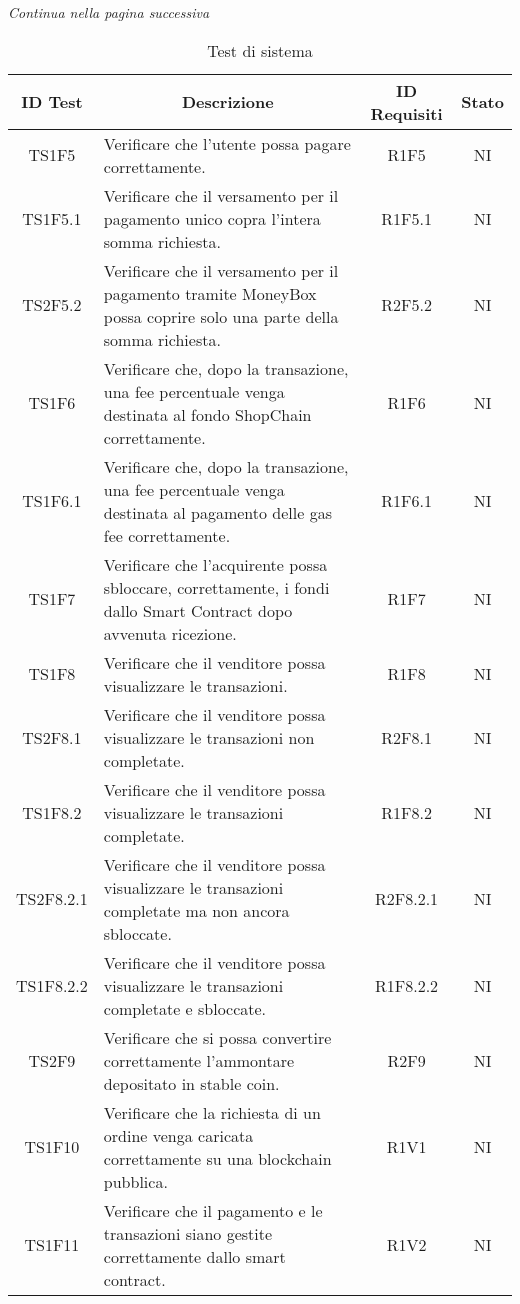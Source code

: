 \begin{center}
  \textit{\small Continua nella pagina successiva}
\end{center}
\begin{table}[H]
  \centering
  \renewcommand{\arraystretch}{1.8}
  \begin{tabular}{c|p{8cm}|c|c}
    \rowcolor[HTML]{125E28}
    \color[HTML]{FFFFFF}\textbf{ID Test}
    & \multicolumn{1}{c}{\color[HTML]{FFFFFF}\textbf{Descrizione}}
    & \color[HTML]{FFFFFF}\textbf{ID Requisiti}
    & \color[HTML]{FFFFFF}\textbf{Stato}\\
    \hline
    TS1F5 &	Verificare che l'utente possa pagare correttamente. &	R1F5 &	NI \\
    TS1F5.1 &	Verificare che il versamento per il pagamento unico copra l'intera somma richiesta. &	R1F5.1 &	NI \\
    TS2F5.2 &	Verificare che il versamento per il pagamento tramite MoneyBox possa coprire solo una parte della somma richiesta. &	R2F5.2 &	NI \\
    TS1F6 &	Verificare che, dopo la transazione, una fee percentuale venga destinata al fondo ShopChain correttamente. &	R1F6 &	NI \\
    TS1F6.1 &	Verificare che, dopo la transazione, una fee percentuale venga destinata al pagamento delle gas fee\glo{} correttamente. &	R1F6.1 &	NI \\
    TS1F7 &	Verificare che l'acquirente possa sbloccare, correttamente, i fondi dallo Smart Contract dopo avvenuta ricezione. &	R1F7 &	NI \\
    TS1F8 &	Verificare che il venditore possa visualizzare le transazioni. &	R1F8 &	NI \\
    TS2F8.1 &	Verificare che il venditore possa visualizzare le transazioni non completate. &	R2F8.1 &	NI \\
    TS1F8.2 &	Verificare che il venditore possa visualizzare le transazioni completate. &	R1F8.2 &	NI \\
    TS2F8.2.1 &	Verificare che il venditore possa visualizzare le transazioni completate ma non ancora sbloccate. &	R2F8.2.1 &	NI \\
    TS1F8.2.2 &	Verificare che il venditore possa visualizzare le transazioni completate e sbloccate. &	R1F8.2.2 &	NI \\
    TS2F9 &	Verificare che si possa convertire correttamente l'ammontare depositato in stable coin. &	R2F9 &	NI \\
    TS1F10 &	Verificare che la richiesta di un ordine venga caricata correttamente su una blockchain pubblica. &	R1V1 &	NI \\
    TS1F11 &	Verificare che il pagamento e le transazioni siano gestite correttamente dallo smart contract. &	R1V2 &	NI \\
  \end{tabular}
  \caption{Test di sistema}
\end{table}

